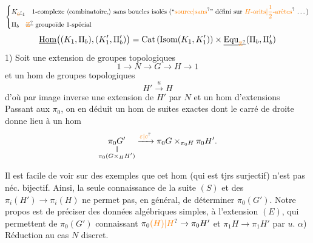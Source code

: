 \[
\left\{\begin{aligned}
&K_{\deleted{\unsure{0}}1}\quad\text{$1$-complexe \inserted{combinatoire,} sans boucles isolés (``\unsure{source|sans}'' défini sur \unsure{$H$-orits|$\frac12$-arêtes} \ldots)}\\
&\Pi_b\quad\deleted{\unsure{\mathbb Z}}\ \text{groupoïde $1$-spécial}
\end{aligned}\right.
\]
\[
\underline{\mathrm{Hom}}\big((K_1,\Pi_b),(K'_1,\Pi'_b)\big)
=\mathrm{Cat}\,(\mathrm{Isom}(K_1,K'_1))\times
\underline{\mathrm{Equ}}_{\deleted{\unsure{\mathbb Z}}}(\Pi_b,\Pi'_b)
\]
1) Soit une extension de groupes topologiques
\[
1\to N\to G\to H\to1 \tag*{(E)}
\]
et un hom de groupes topologiques
\[
 H'\xrightarrow{u}H
\]
d'où par image inverse une extension  de $H'$ par $N$ et un hom d'extensions
Passant aux $\pi_0$, on en déduit un hom de suites exactes 
dont le carré de droite donne lieu à un hom
\[
\underset{\substack{\Vert\\\pi_0(G\times_H H')}}{\pi_0G'}\xrightarrow{\unsure{\varepsilon|c}}
\pi_0G\times_{\pi_0H}\pi_0H'.
\]

Il est facile de voir sur des exemples que cet hom (qui est tjrs surjectif) n'est pas néc. bijectif. Ainsi, la seule connaissance de  la suite $(S)$ et des $\pi_i(H')\to\pi_i(H)$ ne permet pas, en général, de  déterminer $\pi_0(G')$. Notre propos est de préciser des données algébriques simples,  à l'extension $(E)$, qui permettent de    $\pi_0(G')$ connaissant $\pi_0\unsure{(H)|H}\to\pi_0H'$ et $\pi_1H\to\pi_1H'$  par $u$.
$\alpha$) Réduction au cas $N$ discret.

